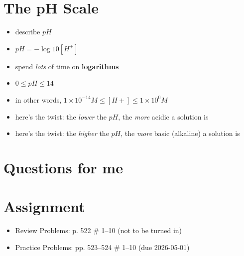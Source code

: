\documentclass[10pt, oneside]{article}   	%
\begin{document}
\section*{The pH Scale}
\begin{itemize}
\item describe $pH$
\item $pH = - \log{10} [H^{+}]$
\item spend \emph{lots} of time on \textbf{logarithms}
\item $ 0 \le pH \le 14$
\item in other words,  $1 \times 10^{-14} M \le [ H+ ] \le 1 \times 10^{0} M$
\item here's the twist: the \emph{lower} the $pH$, the \emph{more} acidic a solution is
\item here's the twist: the \emph{higher} the $pH$, the \emph{more} basic (alkaline) a solution is
\end{itemize}

\section*{Questions for me}

\section*{Assignment}
\begin{itemize}
\item Review Problems: p. 522 \# 1--10 (not to be turned in)
\item Practice Problems: pp. 523--524 \# 1--10 (due 2026-05-01)
\end{itemize}
\end{document}
